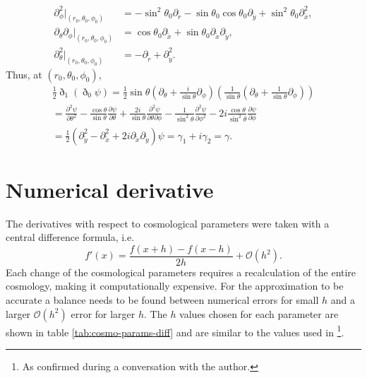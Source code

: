 \documentclass[11pt]{article} %
\begin{document}
\begin{align*}
    \partial_\phi^2|_{(r_0,\theta_0,\phi_0)}&=-\sin^2\theta_0\partial_{\tilde r}-\sin\theta_0\cos\theta_0\partial_{\tilde y}+\sin^2\theta_0\partial^2_{\tilde x},\\
    \partial_\theta\partial_\phi|_{(r_0,\theta_0,\phi_0)}&=\cos\theta_0\partial_{\tilde x}+\sin\theta_0\partial_{\tilde x}\partial_{\tilde y},\\
    \partial_\theta^2|_{(r_0,\theta_0,\phi_0)}&=-\partial_{\tilde r}+\partial^2_{\tilde y}.
\end{align*}
Thus, at $(r_0, \theta_0, \phi_0)$,
\begin{gather*}
    \frac{1}{2}\eth_1(\eth_0\psi) = \frac{1}{2}\sin\theta(\partial_\theta+\frac{i}{\sin\theta}\partial_\phi)(\frac{1}{\sin\theta}(\partial_\theta+\frac{1}{\sin\theta}\partial_\phi))\\
    =\frac{\partial^2 \psi}{\partial \theta^2} - \frac{\cos\theta}{\sin\theta} \frac{\partial \psi}{\partial \theta} + \frac{2 i}{\sin\theta} \frac{\partial^2 \psi}{\partial \theta \partial \phi} - \frac{1}{\sin^2\theta} \frac{\partial^2 \psi}{\partial \phi^2} - 2 i \frac{\cos\theta}{\sin^2\theta} \frac{\partial \psi}{\partial \phi}\\
    =\frac{1}{2}(\partial_{\tilde y}^2 - \partial_{\tilde x}^2 + 2i\partial_{\tilde x}\partial_{\tilde y})\psi
    =\gamma_1 + i\gamma_2 = \gamma.
\end{gather*}

\section{Numerical derivative}
\label{sec:derivatives}
The derivatives with respect to cosmological parameters were taken with a central difference formula, i.e.
\begin{equation*}
    f'(x) = \frac{f(x+h) - f(x-h)}{2h} + \mathcal O (h^2).
\end{equation*}
Each change of the cosmological parameters requires a recalculation of the entire cosmology, making it computationally expensive. For the approximation to be accurate a balance needs to be found between numerical errors for small $h$ and a larger $\mathcal O(h^2)$ error for larger $h$. The $h$ values chosen for each parameter are shown in table \ref{tab:cosmo-params-diff} and are similar to the values used in \cite{Namikawa_2016}\footnote{As confirmed during a conversation with the author.}.
\end{document}
